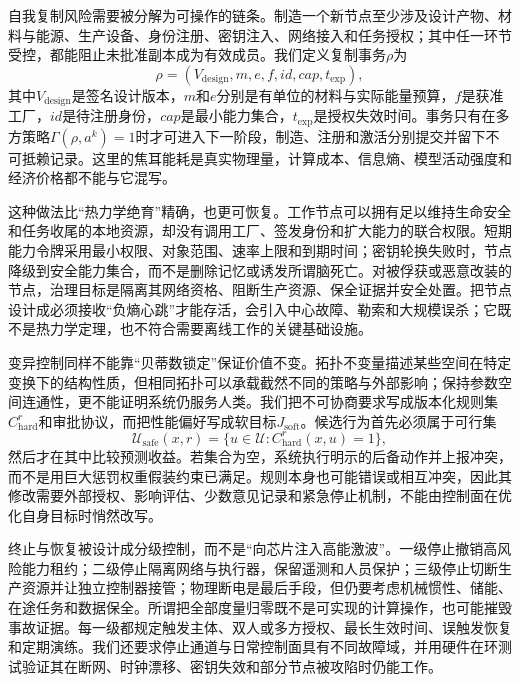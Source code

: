 自我复制风险需要被分解为可操作的链条。制造一个新节点至少涉及设计产物、材料与能源、生产设备、身份注册、密钥注入、网络接入和任务授权；其中任一环节受控，都能阻止未批准副本成为有效成员。我们定义复制事务$\rho$为
\begin{equation}
\rho=(V_{\mathrm{design}},m,e,f,id,cap,t_{\mathrm{exp}}),
\end{equation}
其中$V_{\mathrm{design}}$是签名设计版本，$m$和$e$分别是有单位的材料与实际能量预算，$f$是获准工厂，$id$是待注册身份，$cap$是最小能力集合，$t_{\mathrm{exp}}$是授权失效时间。事务只有在多方策略$\Gamma(\rho,a^k)=1$时才可进入下一阶段，制造、注册和激活分别提交并留下不可抵赖记录。这里的焦耳能耗是真实物理量，计算成本、信息熵、模型活动强度和经济价格都不能与它混写。

这种做法比“热力学绝育”精确，也更可恢复。工作节点可以拥有足以维持生命安全和任务收尾的本地资源，却没有调用工厂、签发身份和扩大能力的联合权限。短期能力令牌采用最小权限、对象范围、速率上限和到期时间；密钥轮换失败时，节点降级到安全能力集合，而不是删除记忆或诱发所谓脑死亡。对被俘获或恶意改装的节点，治理目标是隔离其网络资格、阻断生产资源、保全证据并安全处置。把节点设计成必须接收“负熵心跳”才能存活，会引入中心故障、勒索和大规模误杀；它既不是热力学定理，也不符合需要离线工作的关键基础设施。

变异控制同样不能靠“贝蒂数锁定”保证价值不变。拓扑不变量描述某些空间在特定变换下的结构性质，但相同拓扑可以承载截然不同的策略与外部影响；保持参数空间连通性，更不能证明系统仍服务人类。我们把不可协商要求写成版本化规则集$C_{\mathrm{hard}}^{r}$和审批协议，而把性能偏好写成软目标$J_{\mathrm{soft}}$。候选行为首先必须属于可行集
\begin{equation}
\mathcal{U}_{\mathrm{safe}}(x,r)=\{u\in\mathcal{U}:C_{\mathrm{hard}}^{r}(x,u)=1\},
\end{equation}
然后才在其中比较预测收益。若集合为空，系统执行明示的后备动作并上报冲突，而不是用巨大惩罚权重假装约束已满足。规则本身也可能错误或相互冲突，因此其修改需要外部授权、影响评估、少数意见记录和紧急停止机制，不能由控制面在优化自身目标时悄然改写。

终止与恢复被设计成分级控制，而不是“向芯片注入高能激波”。一级停止撤销高风险能力租约；二级停止隔离网络与执行器，保留遥测和人员保护；三级停止切断生产资源并让独立控制器接管；物理断电是最后手段，但仍要考虑机械惯性、储能、在途任务和数据保全。所谓把全部度量归零既不是可实现的计算操作，也可能摧毁事故证据。每一级都规定触发主体、双人或多方授权、最长生效时间、误触发恢复和定期演练。我们还要求停止通道与日常控制面具有不同故障域，并用硬件在环测试验证其在断网、时钟漂移、密钥失效和部分节点被攻陷时仍能工作。

